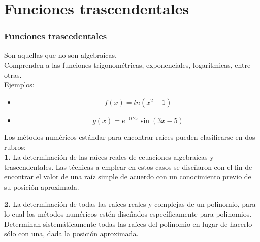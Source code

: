 \documentclass[12pt]{beamer}
\begin{document}
\section{Funciones trascendentales}
\begin{frame}
\frametitle{Funciones trascedentales}
Son aquellas que no son algebraicas.
\\
\bigskip
Comprenden a las funciones trigonom\'{e}tricas, exponenciales, logar\'{i}tmicas, entre otras.
\\
\bigskip
Ejemplos:
\begin{itemize}
\item \[ f(x)=ln(x^{2}-1) \]
\item \[g(x)=e^{-0.2x} \sin(3x-5) \]
\end{itemize}
\end{frame}
\begin{frame}
Los m\'{e}todos num\'{e}ricos est\'{a}ndar para encontrar
ra\'{i}ces pueden clasificarse en dos rubros:
\\
\bigskip
\textbf{1.} La determinaci\'{o}n de las ra\'{i}ces reales de ecuaciones algebraicas y trascendentales. Las t\'{e}cnicas a emplear en estos casos se diseñaron con el fin de encontrar el valor de una ra\'{i}z simple de acuerdo con un conocimiento previo de su posici\'{o}n aproximada.
\end{frame}
\begin{frame}
\textbf{2.} La determinaci\'{o}n de todas las raíces reales y complejas de un polinomio, para lo cual los m\'{e}todos num\'{e}ricos est\'{e}n diseñados espec\'{i}ficamente para polinomios. 
\\
\bigskip
Determinan sistem\'{a}ticamente todas las ra\'{i}ces del polinomio en lugar de hacerlo s\'{o}lo con una, dada la posición aproximada.
\end{frame}
\end{document}
